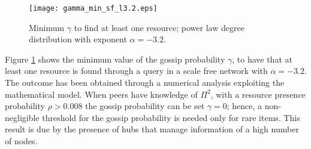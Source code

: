 \documentclass{sig-alternate}
\begin{document}
\begin{figure*}[thbp]
   \vspace{-0.5cm}
   \centering
 \hspace{5mm}
\caption{Average amount of query hits; power law degree distribution with exponent $\alpha=-3.2$. Results are shown for $\Pi^1$. When $\Pi^2$ is considered, the model returns an $\infty$ amount of query hits regardless of $\rho, \sigma$ values (hence not shown in the figure); simulation results confirmed that a high majority of nodes is reached and that queries percolate through the net.}
   \label{fig:sf_res}
     \vspace{-0.5cm}
\end{figure*}


\begin{figure}[thbp]
   \centering
   \texttt{[image: gamma\_min\_sf\_l3.2.eps]}
\caption{Minimum $\gamma$ to find at least one resource; power law degree distribution with exponent $\alpha = -3.2$.}
   \label{fig:one_res_sf}
   \vspace{-0.2cm}
\end{figure}

Figure \ref{fig:one_res_sf} shows the minimum value of the gossip probability $\gamma$, to have that at least one resource is found through a query in a scale free network with $\alpha=-3.2$. The outcome has been obtained through a numerical analysis exploiting the mathematical model. When peers have knowledge of $\Pi^2$, with a resource presence probability $\rho > 0.008$ the gossip probability can be set $\gamma = 0$; hence, a non-negligible threshold for the gossip probability is needed only for rare items. This result is due by the presence of hubs that manage information of a high number of nodes.

\begin{figure*}[thbp]
   \centering
 \hspace{5mm}
 \hspace{5mm}
 \hspace{5mm}
\caption{$\gamma$ value to obtain an infinite amount of query hits; scale-free network topologies with different power law distributions.}
\label{fig:soglie}
\end{figure*}
\end{document}
